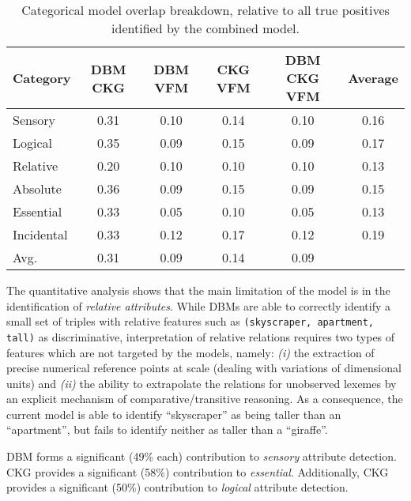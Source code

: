 \documentclass[11pt,a4paper]{article}
\begin{document}
\begin{table*}[!htb]
    \centering
    \begin{center}
        \begin{tabularx}{\textwidth}{ |X|c|c|c|c|c| }
            \hline
            \textbf{Category} & \textbf{DBM}  \textbf{CKG} & \textbf{DBM}  \textbf{VFM} & \textbf{CKG}  \textbf{VFM} & \textbf{DBM}  \textbf{CKG}  \textbf{VFM} & \textbf{Average}\\
            \hline
            Sensory & 0.31 & 0.10 & 0.14 & 0.10 & 0.16\\
           	Logical & 0.35 & 0.09 & 0.15 & 0.09 & 0.17\\
            Relative & 0.20 & 0.10 & 0.10 & 0.10 & 0.13 \\
            Absolute & 0.36 & 0.09 & 0.15 & 0.09 & 0.15\\
            Essential & 0.33 & 0.05 & 0.10 & 0.05 & 0.13\\
            Incidental & 0.33 & 0.12 & 0.17 & 0.12 & 0.19\\
            \hhline{|=|=|=|=|=|=|}
            Avg. & 0.31 & 0.09 & 0.14 & 0.09 &  \\
			\hline
		\end{tabularx}
    \end{center}
    \caption{Categorical model overlap breakdown, relative to all true positives identified by the combined model.}
    \label{table:categorizedOverl}
\end{table*}

The quantitative analysis shows that the main limitation of the model is in the identification of \textit{relative attributes}. While DBMs are able to correctly identify a small set of triples with relative features such as \texttt{(skyscraper, apartment, tall)} as discriminative, interpretation of relative relations requires two types of features which are not targeted by the models, namely: \emph{(i)} the extraction of precise numerical reference points at scale (dealing with variations of dimensional units) and \emph{(ii)} the ability to extrapolate the relations for unobserved lexemes by an explicit mechanism of comparative/transitive reasoning. As a consequence, the current model is able to identify ``skyscraper'' as being taller than an ``apartment'', but fails to identify neither as taller than a ``giraffe''.
	
DBM forms a significant (49\% each) contribution to \emph{sensory} attribute detection. CKG provides a significant (58\%) contribution to \emph{essential}. Additionally, CKG provides a significant (50\%) contribution to \emph{logical} attribute detection.
\end{document}
